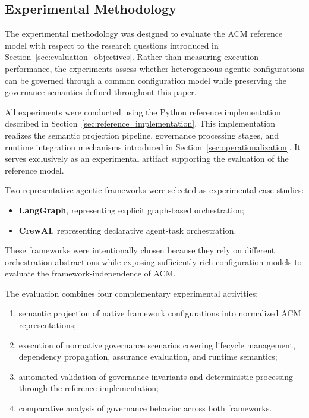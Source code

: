 \documentclass[10pt]{article}
\begin{document}
\subsection{Experimental Methodology}
\label{sec:experimental_methodology}

The experimental methodology was designed to evaluate the ACM reference model with respect to the research questions introduced in Section~\ref{sec:evaluation_objectives}. Rather than measuring execution performance, the experiments assess whether heterogeneous agentic configurations can be governed through a common configuration model while preserving the governance semantics defined throughout this paper.

All experiments were conducted using the Python reference implementation described in Section~\ref{sec:reference_implementation}. This implementation realizes the semantic projection pipeline, governance processing stages, and runtime integration mechanisms introduced in Section~\ref{sec:operationalization}. It serves exclusively as an experimental artifact supporting the evaluation of the reference model.

Two representative agentic frameworks were selected as experimental case studies:

\begin{itemize}
\item \textbf{LangGraph}, representing explicit graph-based orchestration;
\item \textbf{CrewAI}, representing declarative agent-task orchestration.
\end{itemize}

These frameworks were intentionally chosen because they rely on different orchestration abstractions while exposing sufficiently rich configuration models to evaluate the framework-independence of ACM.

The evaluation combines four complementary experimental activities:

\begin{enumerate}

\item semantic projection of native framework configurations into normalized ACM representations;

\item execution of normative governance scenarios covering lifecycle management, dependency propagation, assurance evaluation, and runtime semantics;

\item automated validation of governance invariants and deterministic processing through the reference implementation;

\item comparative analysis of governance behavior across both frameworks.

\end{enumerate}
\end{document}
